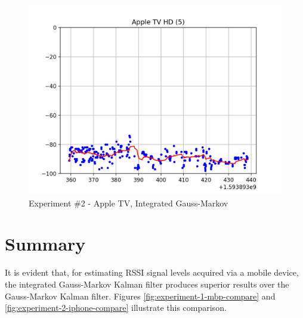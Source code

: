 \documentclass[12pt]{article}
\begin{document}
\begin{figure}[ht]
    \centering
    \includegraphics[width=1.0\textwidth]{Experiment-2-ATV-IGM.png}
    \caption{Experiment \#2 - Apple TV, Integrated Gauss-Markov}
    \label{fig:experiment-2-atv-igm}
\end{figure}



%
%

\clearpage
\section{Summary}

It is evident that, for estimating RSSI signal levels acquired via a mobile device, the
integrated Gauss-Markov Kalman filter produces superior results over the Gauss-Markov
Kalman filter.
Figures \ref{fig:experiment-1-mbp-compare} and \ref{fig:experiment-2-iphone-compare}
illustrate this comparison.
\end{document}
